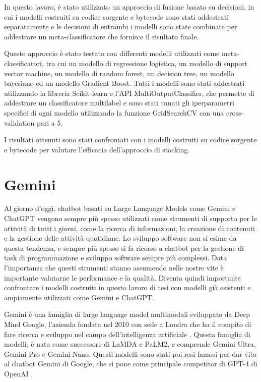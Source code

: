 \documentclass[../../Thesis.tex]{subfiles}
\begin{document}
In questo lavoro, \`e stato utilizzato un approccio di fusione basato su decisioni, in cui i modelli costruiti su codice sorgente e bytecode sono stati addestrati separatamente e le decisioni di entrambi i modelli sono state combinate per addestrare un meta-classificatore che fornisce il risultato finale. 

Questo approccio \`e stato testato con differenti modelli utilizzati come meta-classificatori, tra cui un modello di regressione logistica, un modello di support vector machine, un modello di random forest, un decision tree, un modello bayesiano ed un modello Gradient Boost. Tutti i modelli sono stati addestrati utilizzando la libreria Scikit-learn e l'API MultiOutputClassifier, che permette di addestrare un classificatore multilabel  e sono stati tunati gli iperparametri specifici di ogni modello utilizzando la funzione GridSearchCV con una cross-validation pari a 5.

I risultati ottenuti sono stati confrontati con i modelli costruiti su codice sorgente e bytecode per valutare l'efficacia dell'approccio di stacking.

\section{Gemini}
Al giorno d'oggi, chatbot basati su Large Language Models come Gemini e ChatGPT vengono sempre pi\`u spesso utilizzati come strumenti di supporto per le attivit\`a di tutti i giorni, come la ricerca di informazioni, la creazione di contenuti e la gestione delle attivit\`a quotidiane. Lo sviluppo software non si esime da questa tendenza, e sempre pi\`u spesso si fa ricorso a chatbot per la gestione di task di programmazione e sviluppo software sempre pi\`u complessi. Data l'importanza che questi strumenti stanno assumendo nelle nostre vite \`e importante valutarne le performance e la qualit\`a. Diventa quindi importante confrontare i modelli costruiti in questo lavoro di tesi con modelli gi\`a esistenti e ampiamente utilizzati come Gemini e ChatGPT.

Gemini \`e una famiglia di large language model multimodali sviluppato da Deep Mind Google, l'azienda fondata nel 2010 con sede a Londra che ha il compito di fare ricerca e sviluppo nel campo dell'intelligenza artificiale \cite{DeepMind}. 
Questa famiglia di modelli, \`e nata come successore di LaMDA e PaLM2, e comprende Gemini Ultra, Gemini Pro e Gemini Nano. Questi modelli sono stati poi resi famosi per dar vita al chatbot Gemini di Google, che si pone come principale competitor di GPT-4 di OpenAI \cite{Gemini}. 
\end{document}
